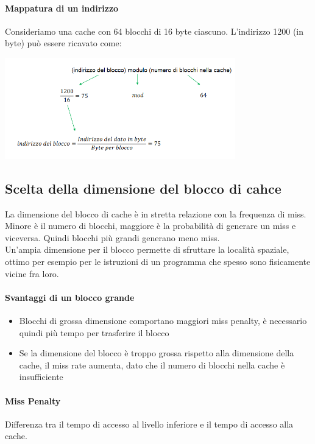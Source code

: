 \documentclass[12pt, a4paper, openany]{book}
\begin{document}
\paragraph{Mappatura di un indirizzo} Consideriamo una cache con 64 blocchi di 16 byte ciascuno.
L'indirizzo 1200 (in byte) può essere ricavato come:
\begin{center}
    \includegraphics[width=100mm, scale=0.5]{mappatura indirizzo esempio.png}
\end{center}

\subsection*{Scelta della dimensione del blocco di cahce}
La dimensione del blocco di cache è in stretta relazione con la frequenza di miss.
Minore è il numero di blocchi, maggiore è la probabilità di generare un miss e viceversa.
Quindi blocchi più grandi generano meno miss.
\\ Un'ampia dimensione per il blocco permette di sfruttare la località spaziale, ottimo per
esempio per le istruzioni di un programma che spesso sono fisicamente vicine fra loro.
\paragraph{Svantaggi di un blocco grande}
\begin{itemize}
    \item Blocchi di grossa dimensione comportano maggiori miss penalty, è necessario quindi
    più tempo per trasferire il blocco
    \item Se la dimensione del blocco è troppo grossa rispetto alla dimensione della cache,
    il miss rate aumenta, dato che il numero di blocchi nella cache è insufficiente
\end{itemize}
\paragraph{Miss Penalty} Differenza tra il tempo di accesso al livello inferiore e il tempo di
accesso alla cache.
\end{document}
